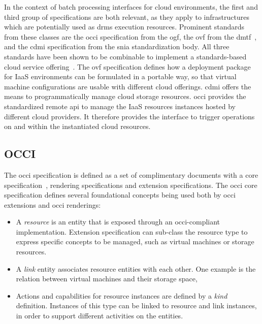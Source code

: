 \documentclass[twocolumn]{svjour3}       %
\begin{document}
In the context of batch processing interfaces for cloud environments, the first and third group of specifications are both relevant, as they apply to infrastructures which are potentially used as \gls{drms} execution resources. Prominent standards from these classes are the \gls{occi} specification from the \gls{ogf}, the \gls{ovf} from the \gls{dmtf}~\cite{citemaster_9644}, and the \gls{cdmi} specification from the \gls{snia} standardization body. All three standards have been shown to be combinable to implement a standards-based cloud service offering~\cite{citemaster_9645}. The \gls{ovf} specification defines how a deployment package for IaaS environments can be formulated in a portable way, so that virtual machine configurations are usable with different cloud offerings. \gls{cdmi} offers the means to programmatically manage cloud storage resources. \gls{occi} provides the standardized remote \gls{api} to manage the IaaS resources instances hosted by different cloud providers. It therefore provides the interface to trigger operations on and within the instantiated cloud resources. 



\subsection{OCCI}

The \gls{occi} specification is defined as a set of complimentary documents with a core specification~\cite{citemaster_9270}, rendering specifications and extension specifications. The \gls{occi} core specification defines several foundational concepts being used both by \gls{occi} extensions and \gls{occi} renderings:

\begin{itemize}
\item A \emph{resource} is an entity that is exposed through an \gls{occi}-compliant implementation. Extension specification can sub-class the resource type to express specific concepts to be managed, such as virtual machines or storage resources.
\item A \emph{link} entity associates resource entities with each other. One example is the relation between virtual machines and their storage space,
\item Actions and capabilities for resource instances are defined by a \emph{kind} definition. Instances of this type can be linked to resource and link instances, in order to support different activities on the entities.
\end{itemize}
\end{document}
